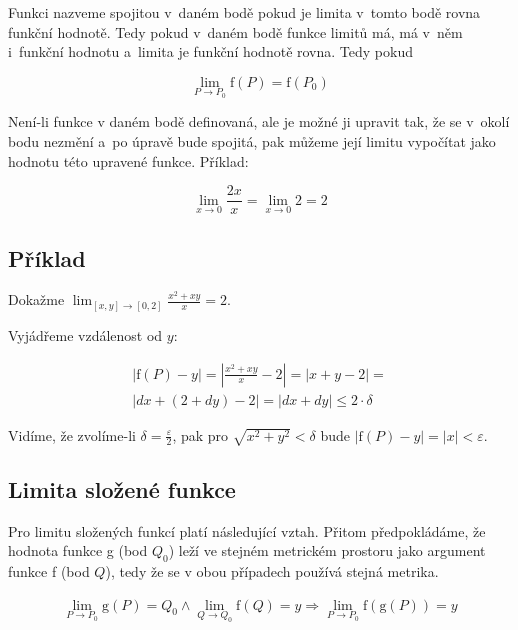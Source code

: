 Funkci nazveme spojitou v~daném bodě pokud je limita v~tomto bodě rovna funkční hodnotě. Tedy pokud v~daném bodě funkce limitů má, má v~něm i~funkční hodnotu a~limita je funkční hodnotě rovna. Tedy pokud

\begin{equation}
\lim_{P \to P_0} \mathrm{f}(P) = \mathrm{f}(P_0)
\end{equation}

Není-li funkce v daném bodě definovaná, ale je možné ji upravit tak, že se v~okolí bodu nezmění a~po úpravě bude spojitá, pak můžeme její limitu vypočítat jako hodnotu této upravené funkce. Příklad:

\begin{equation}
\lim_{x \to 0} \frac{2x}{x} = \lim_{x \to 0} 2 = 2
\end{equation}

\subsection{Příklad}

Dokažme \(\lim_{[x, y] \to [0, 2]} \frac{x^2 + x y}{x} = 2\).

Vyjádřeme vzdálenost od \(y\):

\begin{equation}
\begin{split}
|\mathrm{f}(P) - y| = \left|\frac{x^2 + x y}{x} - 2 \right| = \left|x + y - 2 \right| = \\
\left|dx + ( 2+ dy) - 2 \right| = \left|dx + dy\right| \leq 2 \cdot \delta
\end{split}
\end{equation}

Vidíme, že zvolíme-li \(\delta = \frac{\varepsilon}{2}\), pak pro \(\sqrt{x^2 + y^2} < \delta\) bude \(|\mathrm{f}(P) - y| = |x| < \varepsilon\).

\subsection{Limita složené funkce}

Pro limitu složených funkcí platí následující vztah. Přitom předpokládáme, že hodnota funkce g (bod \(Q_0\)) leží ve stejném metrickém prostoru jako argument funkce f (bod \(Q\)), tedy že se v obou případech používá stejná metrika.

\begin{equation}
\label{eq:limita_slozene_funkce}
\begin{split}
\lim_{P \to P_0} \mathrm{g}(P) = Q_0 \land \lim_{Q \to Q_0} \mathrm{f}(Q) = y \Rightarrow \lim_{P \to P_0} \mathrm{f}(\mathrm{g}(P)) = y
\end{split}
\end{equation}

